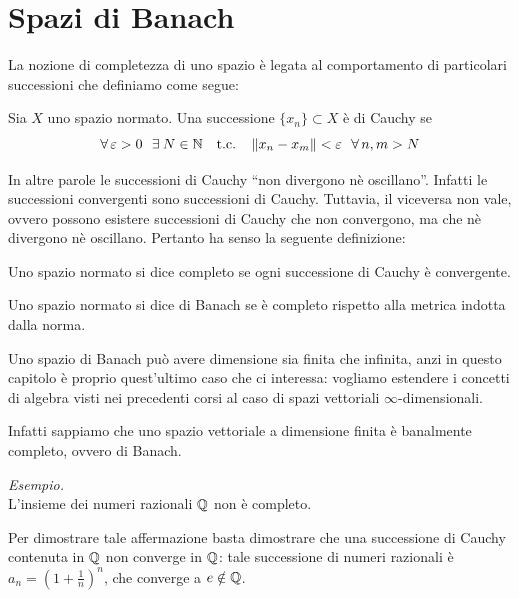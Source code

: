 \newpage

\section{Spazi di Banach}

La nozione di completezza di uno spazio è legata al comportamento di particolari successioni che definiamo come segue:

\begin{defn}
Sia $X$ uno spazio normato. Una successione $\{x_{n}\}\subset X$ è di Cauchy se
\begin{equation*}
\forall \varepsilon > 0\ \ \exists N\in\NN\ \ \text{ t.c. }\ \ \Vert x_{n} - x_{m} \Vert < \varepsilon\ \ \forall n,m>N
\end{equation*}
\end{defn}
In altre parole le successioni di Cauchy ``non divergono nè oscillano''. Infatti le successioni convergenti sono successioni di Cauchy. Tuttavia, il viceversa non vale, ovvero possono esistere successioni di Cauchy che non convergono, ma che nè divergono nè oscillano. Pertanto ha senso la seguente definizione:
\begin{defn}
Uno spazio normato si dice completo se ogni successione di Cauchy è convergente.
\end{defn}

\begin{defn}
Uno spazio normato si dice di Banach se è completo rispetto alla metrica indotta dalla norma.
\end{defn}

\begin{rem}
Uno spazio di Banach può avere dimensione sia finita che infinita, anzi in questo capitolo è proprio quest'ultimo caso che ci interessa: vogliamo estendere i concetti di algebra visti nei precedenti corsi al caso di spazi vettoriali $\infty$-dimensionali. 

Infatti sappiamo che uno spazio vettoriale a dimensione finita è banalmente completo, ovvero di Banach.
\end{rem}

\textit{Esempio.}\\
L'insieme dei numeri razionali $\mathbb{Q}$ non è completo.

Per dimostrare tale affermazione basta dimostrare che una successione di Cauchy contenuta in $\mathbb{Q}$ non converge in $\mathbb{Q}$: tale successione di numeri razionali è $a_n=\left(1+\frac{1}{n}\right)^n$, che converge a $e\notin \mathbb{Q}$.

